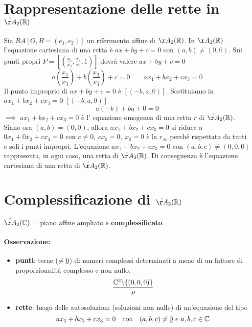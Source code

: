 \documentclass{report}
\begin{document}
\section{Rappresentazione delle rette in \(\tilde{\AA}_{2}(\RR) \)}
Sia \(RA [O, B = (e_1, e_2)]\) un riferimento affine di \(\AA_{2}(\RR) \). In \(\AA_{2}(\RR) \) l'equazione cartesiana di una retta è \(ax+by+c = 0\) con \((a,b) \neq (0,0)\). Sui punti propri \(P = \left[ \left( \frac{x_1}{x_3}, \frac{x_2}{x_3}, 1 \right)  \right] \) dovrà valere \(ax+by+c = 0\)\[
a \left( \frac{x_1}{x_3} \right) + b \left( \frac{x_2}{x_3} \right) + c = 0 \qquad ax_1+ bx_2+ cx_3=0
\] Il punto improprio di \(ax+by+c=0\) è \([(-b, a, 0)]\). Sostituiamo in \(ax_1+ bx_2+ cx_3=0\) \([(-b, a, 0)]\) \[
a(-b) + b a + 0 = 0
\] \(\implies \) \(ax_1+ bx_2+ cx_3=0\) è l' equazione omogenea di una retta \(r\) di \(\tilde{\AA}_{2}(\RR) \). \\
Siano ora \((a,b) = (0,0)\), allora \(ax_1+ bx_2+ cx_3=0\) si riduce a \(0 x_1+0x_2+cx_3=0\) con \(c \neq 0, \ cx_3 = 0, \ x_3 = 0\) è la \(r_{\infty}\) perché rispettata da tutti e soli i punti impropri. 
L'equazione \(ax_1+bx_2+cx_3= 0\) con \((a,b,c) \neq (0,0,0)\) rappresenta, in ogni caso, una retta di \(\tilde{\AA}_{2}(\RR) \). Di conseguenza è l'equazione cartesiana di una retta di \(\tilde{\AA}_{2}(\RR)\).

\section{Complessificazione di \(\tilde{\AA}_{2}(\RR) \)}

\(\tilde{\AA}_{2}(\CC)\) = piano affine ampliato e \textbf{complessificato}.
\paragraph{Osservazione:} 
\begin{itemize}
    \item \textbf{punti}: terne (\(\neq \underline{0} \)) di numeri complessi determinati a meno di un fattore di proporzionalità complesso e non nullo.
\[
\frac{\CC^{3}\backslash \{(0,0,0)\} }{\rho }
\] 
    \item \textbf{rette}: luogo delle autosoluzioni (soluzioni non nulle) di un'equazione del tipo \[
    ax_1+bx_2+cx_3= 0 \quad \text{con} \quad (a,b,c) \neq \ul{0} \ e \ a,b,c \in \CC
    \] 
\end{itemize}

\end{document}
